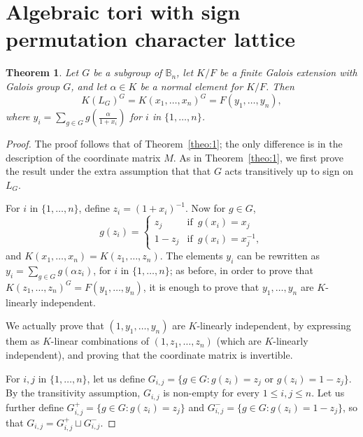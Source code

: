 \documentclass[12pt]{article}
\theoremstyle{plain}
\newtheorem{theorem}{Theorem}
\begin{document}
\section{Algebraic tori with sign permutation character lattice}


\begin{theorem}\label{nonamesign}
  Let $G$ be a subgroup of $\mathbb{B}_n$, let $K/F$ be a finite
  Galois extension with Galois group $G$, and let $\alpha \in K$ be a
  normal element for $K/F$. Then
  $$K(L_G)^G = K(x_1,\ldots, x_n)^G = F(y_1, \ldots, y_{n}),$$ 
  where $y_i = \sum_{g \in G} g\left (\frac{\alpha}{1+x_i}\right)$ for $i$ in $\{1, \ldots, n\}$.
\end{theorem}
\begin{proof}
  The proof follows that of Theorem~\ref{theo:1}; the only difference
  is in the description of the coordinate matrix $M$.
  As in Theorem~\ref{theo:1}, we first prove the result under the
  extra assumption that that $G$ acts transitively up to sign on
  $L_G$.


  For $i$ in $\{1,\dots,n\}$, define $z_i = (1+x_i)^{-1} $. Now for $g
  \in G$, $$g(z_i) = \begin{cases} z_j & \text{if} \,\,\, g(x_i) = x_j
    \\ 1-z_j & \text{if} \,\,\, g(x_i) = x_j^{-1},
  \end{cases}$$ 
  and $K(x_1, \ldots , x_n) = K(z_1, \ldots, z_n).$ The elements $y_i$
  can be rewritten as $y_i = \sum_{g \in G} g ({\alpha}z_i)$, for $i$
  in $\{1, \ldots, n\}$; as before, in order to prove that
  $K(z_1,\ldots, z_n)^G = F(y_1, \ldots, y_{n})$, it is enough to
  prove that $y_1,\dots,y_n$ are $K$-linearly independent.

  We actually prove that $(1,y_1,\dots,y_n)$ are $K$-linearly
  independent, by expressing them as $K$-linear combinations of
  $(1,z_1,\dots,z_n)$ (which are $K$-linearly independent), and
  proving that the coordinate matrix is invertible.

  For $i,j$ in $\lbrace 1, \ldots , n \rbrace$, let us define $G_{i,j} =
  \lbrace g \in G : g(z_i) = z_j \,\, \text{or} \,\, g(z_i) = 1-z_j
  \rbrace $. By the transitivity assumption, $G_{i,j}$ is
  non-empty for every $1 \leq i,j \leq n$. Let us further define $G^{+}_{i,j}
  = \lbrace g \in G : g(z_i) = z_j \rbrace$ and $G^{-}_{i,j} =
  \lbrace g \in G : g(z_i) = 1- z_j \rbrace$, so that $G_{i,j}=
  G^{+}_{i,j}\sqcup G^{-}_{i,j}$.  


\end{proof}
\end{document}
